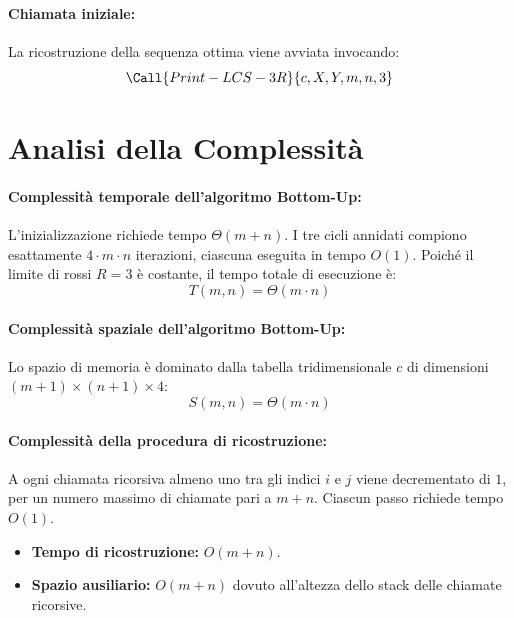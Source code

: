 \paragraph{Chiamata iniziale:}
La ricostruzione della sequenza ottima viene avviata invocando:
\[
\Call{Print-LCS-3R}{c, X, Y, m, n, 3}
\]

\section{Analisi della Complessità}

\paragraph{Complessità temporale dell'algoritmo Bottom-Up:}
L'inizializzazione richiede tempo $\Theta(m + n)$. I tre cicli annidati compiono esattamente $4 \cdot m \cdot n$ iterazioni, ciascuna eseguita in tempo $O(1)$. Poiché il limite di rossi $R = 3$ è costante, il tempo totale di esecuzione è:
\[
T(m, n) = \Theta(m \cdot n)
\]

\paragraph{Complessità spaziale dell'algoritmo Bottom-Up:}
Lo spazio di memoria è dominato dalla tabella tridimensionale $c$ di dimensioni $(m + 1) \times (n + 1) \times 4$:
\[
S(m, n) = \Theta(m \cdot n)
\]

\paragraph{Complessità della procedura di ricostruzione:}
A ogni chiamata ricorsiva almeno uno tra gli indici $i$ e $j$ viene decrementato di $1$, per un numero massimo di chiamate pari a $m + n$. Ciascun passo richiede tempo $O(1)$.
\begin{itemize}
    \item \textbf{Tempo di ricostruzione:} $O(m + n)$.
    \item \textbf{Spazio ausiliario:} $O(m + n)$ dovuto all'altezza dello stack delle chiamate ricorsive.
\end{itemize}